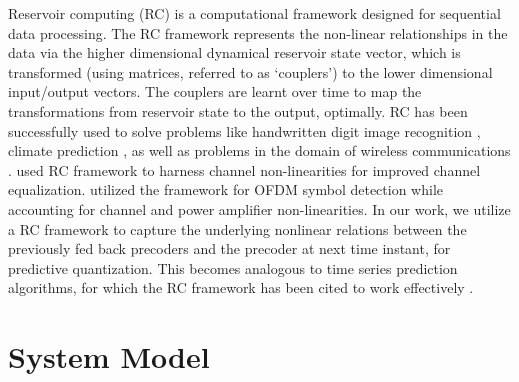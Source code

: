 \documentclass[conference]{IEEEtran}
\begin{document}
{
Reservoir computing (RC) is a computational framework designed for sequential data processing.
The RC framework represents the non-linear relationships in the data via the higher dimensional dynamical reservoir state vector, which is transformed (using matrices, referred to as `couplers') to the lower dimensional input/output vectors. The couplers are learnt over time to map the transformations from reservoir state to the output, optimally.
RC has been successfully used to solve problems like handwritten digit image recognition \cite{jalalvand2015real}, climate prediction \cite{pathak2017using}, as well as problems in the domain of wireless communications \cite{jaeger2004harnessing,mosleh2017brain,shafin2018realizing}.
\cite{jaeger2004harnessing} used RC framework to harness channel non-linearities for improved channel equalization.
\cite{mosleh2017brain,shafin2018realizing} utilized the framework for OFDM symbol detection while accounting for channel and power amplifier non-linearities.
In our work, we utilize a RC framework to capture the underlying nonlinear relations between the previously fed back precoders and the precoder at next time instant, for predictive quantization. This becomes analogous to time series prediction algorithms, for which the RC framework has been cited to work effectively \cite{mosleh2017brain}.

\vspace{-1pt}
\section{System Model}
\label{section2}

}
\end{document}
